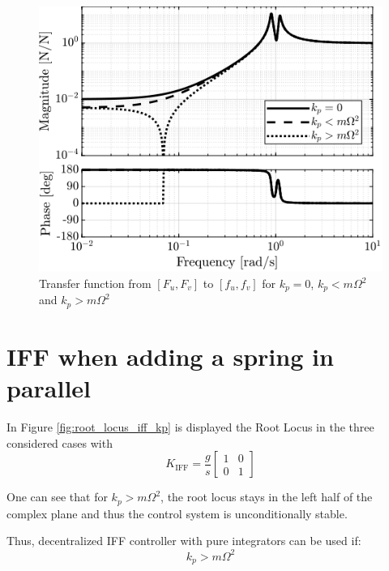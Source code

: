 \documentclass[a4paper, 10pt, DIV=12, parskip=full]{scrreprt}
\begin{document}
\begin{figure}[htbp]
\centering
\includegraphics[scale=1]{figs/plant_iff_kp.png}
\caption{\label{fig:plant_iff_kp}Transfer function from \([F_u, F_v]\) to \([f_u, f_v]\) for \(k_p = 0\), \(k_p < m \Omega^2\) and \(k_p > m \Omega^2\)}
\end{figure}

\section{IFF when adding a spring in parallel}
\label{sec:org9f1e3df}
In Figure \ref{fig:root_locus_iff_kp} is displayed the Root Locus in the three considered cases with
\begin{equation}
  K_{\text{IFF}} = \frac{g}{s} \begin{bmatrix}
  1 & 0 \\
  0 & 1
\end{bmatrix}
\end{equation}

One can see that for \(k_p > m \Omega^2\), the root locus stays in the left half of the complex plane and thus the control system is unconditionally stable.

Thus, decentralized IFF controller with pure integrators can be used if:
\begin{equation}
  k_{p} > m \Omega^2
\end{equation}
\end{document}
